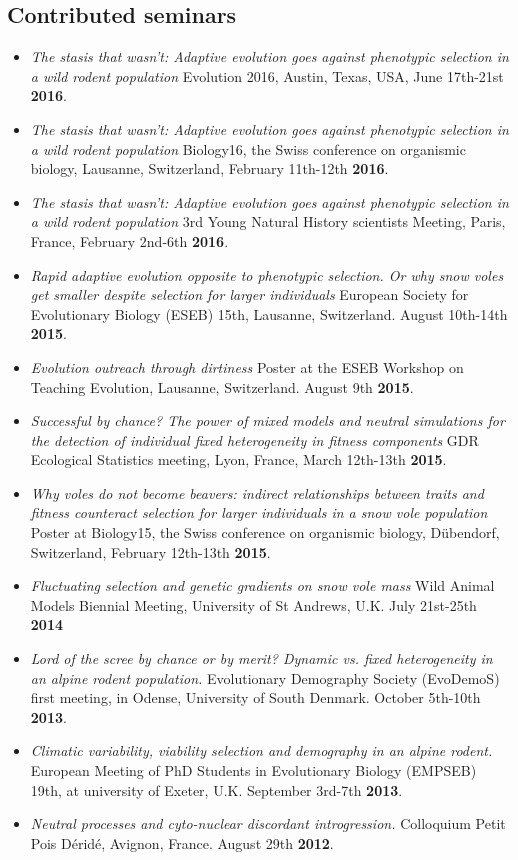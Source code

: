 \subsection{Contributed seminars}
\begin{itemize}
\item \textit{The stasis that wasn't: Adaptive evolution goes against phenotypic selection in a wild rodent population} Evolution 2016, Austin, Texas, USA, June 17th-21st \textbf{2016}.
\item \textit{The stasis that wasn't: Adaptive evolution goes against phenotypic selection in a wild rodent population} Biology16, the Swiss conference on organismic biology, Lausanne, Switzerland, February 11th-12th \textbf{2016}.
\item \textit{The stasis that wasn't: Adaptive evolution goes against phenotypic selection in a wild rodent population} 3rd Young Natural History scientists Meeting, Paris, France, February 2nd-6th \textbf{2016}.
\item \textit{Rapid adaptive evolution opposite to phenotypic selection. Or why snow voles get smaller despite selection for larger individuals} European Society for Evolutionary Biology (ESEB) 15th, Lausanne, Switzerland. August 10th-14th \textbf{2015}.
\item \textit{Evolution outreach through dirtiness} Poster at the ESEB Workshop on Teaching Evolution, Lausanne, Switzerland. August 9th \textbf{2015}.
\item \textit{Successful by chance? The power of mixed models and neutral simulations for the detection of individual fixed heterogeneity in fitness components} GDR Ecological Statistics meeting, Lyon, France, March 12th-13th \textbf{2015}.
\item \textit{Why voles do not become beavers: indirect relationships between traits and fitness counteract selection for larger individuals in a snow vole population} Poster at Biology15, the Swiss conference on organismic biology, D\"{u}bendorf, Switzerland, February 12th-13th \textbf{2015}.
\item \textit{Fluctuating selection and genetic gradients on snow vole mass} Wild Animal Models Biennial Meeting, University of St Andrews, U.K. July 21st-25th \textbf{2014}
\item \textit{Lord of the scree by chance or by merit? Dynamic vs. fixed heterogeneity in an alpine rodent population.} Evolutionary Demography Society (EvoDemoS) first meeting, in Odense, University of South Denmark. October 5th-10th \textbf{2013}.
\item \textit{Climatic variability, viability selection and demography in an alpine rodent.} European Meeting of PhD Students in Evolutionary Biology (EMPSEB) 19th, at university of Exeter, U.K. September 3rd-7th \textbf{2013}.
\item \textit{Neutral processes and cyto-nuclear discordant introgression.} Colloquium Petit Pois D\'{e}rid\'{e}, Avignon, France. August 29th \textbf{2012}.
\end{itemize}

